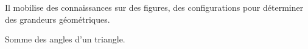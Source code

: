 \begin{prerequis}[{Objectifs de 5\up{e}}]        
    Il mobilise des connaissances sur des figures, des configurations pour déterminer des grandeurs géométriques.
    
    Somme des angles d'un triangle.
\end{prerequis}